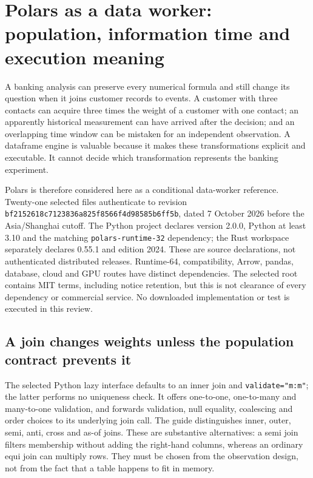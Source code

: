 \section{Polars as a data worker: population, information time and execution meaning}
\label{sec:exec23-polars-worker}

A banking analysis can preserve every numerical formula and still change its
question when it joins customer records to events. A customer with three
contacts can acquire three times the weight of a customer with one contact;
an apparently historical measurement can have arrived after the decision;
and an overlapping time window can be mistaken for an independent
observation. A dataframe engine is valuable because it makes these
transformations explicit and executable. It cannot decide which
transformation represents the banking experiment.

Polars is therefore considered here as a conditional data-worker reference.
Twenty-one selected files authenticate to revision
\texttt{bf2152618c7123836a825f8566f4d98585b6ff5b}, dated 7 October 2026 before
the Asia/Shanghai cutoff. The Python project declares version 2.0.0,
Python at least 3.10 and the matching \texttt{polars-runtime-32} dependency;
the Rust workspace separately declares 0.55.1 and edition 2024. These are
source declarations, not authenticated distributed releases. Runtime-64,
compatibility, Arrow, pandas, database, cloud and GPU routes have distinct
dependencies. The selected root contains MIT terms, including notice
retention, but this is not clearance of every dependency or commercial
service. No downloaded implementation or test is executed in this review.
\citep{exec23_polars_sources}

\subsection{A join changes weights unless the population contract prevents it}

The selected Python lazy interface defaults to an inner join and
\texttt{validate="m:m"}; the latter performs no uniqueness check. It offers
one-to-one, one-to-many and many-to-one validation, and forwards validation,
null equality, coalescing and order choices to its underlying join call.
The guide distinguishes inner, outer, semi, anti, cross and as-of joins.
These are substantive alternatives: a semi join filters membership without
adding the right-hand columns, whereas an ordinary equi join can multiply
rows. They must be chosen from the observation design, not from the fact
that a table happens to fit in memory.\citep{exec23_polars_sources}

